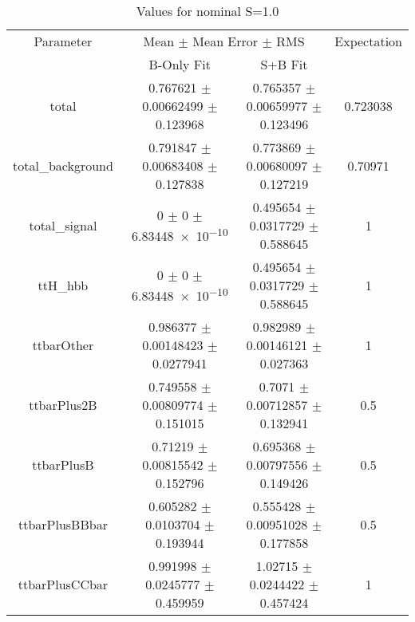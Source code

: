 \begin{table}
\centering
\caption{Values for nominal S=1.0}
\begin{tabular}{cccc}
\toprule
Parameter & \multicolumn{2}{c}{Mean $\pm$ Mean Error $\pm$ RMS} & Expectation\\
 & B-Only Fit & S+B Fit & \\
\midrule
total & \num{0.767621} $\pm$ \num{0.00662499} $\pm$ \num{0.123968} & \num{0.765357} $\pm$ \num{0.00659977} $\pm$ \num{0.123496} & \num{0.723038}\\
total\_background & \num{0.791847} $\pm$ \num{0.00683408} $\pm$ \num{0.127838} & \num{0.773869} $\pm$ \num{0.00680097} $\pm$ \num{0.127219} & \num{0.70971}\\
total\_signal & \num{0} $\pm$ \num{0} $\pm$ \num{6.83448e-10} & \num{0.495654} $\pm$ \num{0.0317729} $\pm$ \num{0.588645} & \num{1}\\
ttH\_hbb & \num{0} $\pm$ \num{0} $\pm$ \num{6.83448e-10} & \num{0.495654} $\pm$ \num{0.0317729} $\pm$ \num{0.588645} & \num{1}\\
ttbarOther & \num{0.986377} $\pm$ \num{0.00148423} $\pm$ \num{0.0277941} & \num{0.982989} $\pm$ \num{0.00146121} $\pm$ \num{0.027363} & \num{1}\\
ttbarPlus2B & \num{0.749558} $\pm$ \num{0.00809774} $\pm$ \num{0.151015} & \num{0.7071} $\pm$ \num{0.00712857} $\pm$ \num{0.132941} & \num{0.5}\\
ttbarPlusB & \num{0.71219} $\pm$ \num{0.00815542} $\pm$ \num{0.152796} & \num{0.695368} $\pm$ \num{0.00797556} $\pm$ \num{0.149426} & \num{0.5}\\
ttbarPlusBBbar & \num{0.605282} $\pm$ \num{0.0103704} $\pm$ \num{0.193944} & \num{0.555428} $\pm$ \num{0.00951028} $\pm$ \num{0.177858} & \num{0.5}\\
ttbarPlusCCbar & \num{0.991998} $\pm$ \num{0.0245777} $\pm$ \num{0.459959} & \num{1.02715} $\pm$ \num{0.0244422} $\pm$ \num{0.457424} & \num{1}\\
\bottomrule
\end{tabular}
\end{table}